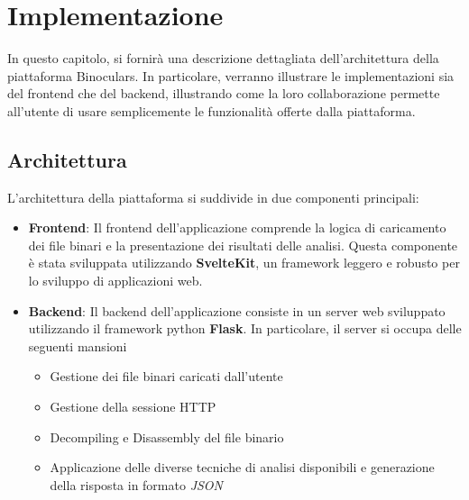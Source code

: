 \documentclass[../main.tex]{subfiles}
\begin{document}
\chapter{Implementazione}
In questo capitolo, si fornirà una descrizione dettagliata dell'architettura della piattaforma Binoculars.
In particolare, verranno illustrare le implementazioni sia del frontend che del backend,
illustrando come la loro collaborazione permette all'utente di usare semplicemente le funzionalità offerte dalla piattaforma.
\section{Architettura}
L'architettura della piattaforma si suddivide in due componenti principali:
\begin{itemize}
    \item \textbf{Frontend}: Il frontend dell'applicazione comprende la logica di caricamento dei file binari e la presentazione
    dei risultati delle analisi. Questa componente è stata sviluppata utilizzando \textbf{SvelteKit}, un framework leggero e robusto per lo sviluppo
    di applicazioni web.
    \item \textbf{Backend}: Il backend dell'applicazione consiste in un server web sviluppato utilizzando il framework python \textbf{Flask}.
    In particolare, il server si occupa delle seguenti mansioni
    \begin{itemize}
        \item Gestione dei file binari caricati dall'utente
        \item Gestione della sessione HTTP
        \item Decompiling e Disassembly del file binario
        \item Applicazione delle diverse tecniche di analisi disponibili e generazione della risposta in formato \textit{JSON}
    \end{itemize}
\end{itemize}
\end{document}
